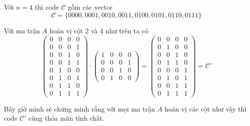 \begin{example}
    Với $n=4$ thì code $\mathcal{C}$ gồm các vector \[ \mathcal{C} = \{ 0000, 0001, 0010, 0011, 0100, 0101, 0110, 0111 \} \]
\end{example}

Với ma trận $A$ hoán vị cột 2 và 4 như trên ta có
\begin{equation*}
    \begin{pmatrix}
        0 & 0 & 0 & 0 \\
        0 & 0 & 0 & 1 \\
        0 & 0 & 1 & 0 \\
        0 & 0 & 1 & 1 \\
        0 & 1 & 0 & 0 \\
        0 & 1 & 0 & 1 \\
        0 & 1 & 1 & 0 \\
        0 & 1 & 1 & 1 
    \end{pmatrix} \cdot 
    \begin{pmatrix}
        1 & 0 & 0 & 0 \\
        0 & 0 & 0 & 1 \\ 
        0 & 0 & 1 & 0 \\ 
        0 & 1 & 0 & 0 
    \end{pmatrix} = 
    \begin{pmatrix} 
        0 & 0 & 0 & 0 \\ 
        0 & 1 & 0 & 0 \\ 
        0 & 0 & 1 & 0 \\ 
        0 & 1 & 1 & 0 \\ 
        0 & 0 & 0 & 1 \\ 
        0 & 1 & 0 & 1 \\ 
        0 & 0 & 1 & 1 \\ 
        0 & 1 & 1 & 1
    \end{pmatrix} = \mathcal{C}'
\end{equation*}

Bây giờ mình sẽ chứng minh rằng với mọi ma trận $A$ hoán vị các cột như vậy thì code $\mathcal{C}'$ cũng thỏa mãn tính chất.

